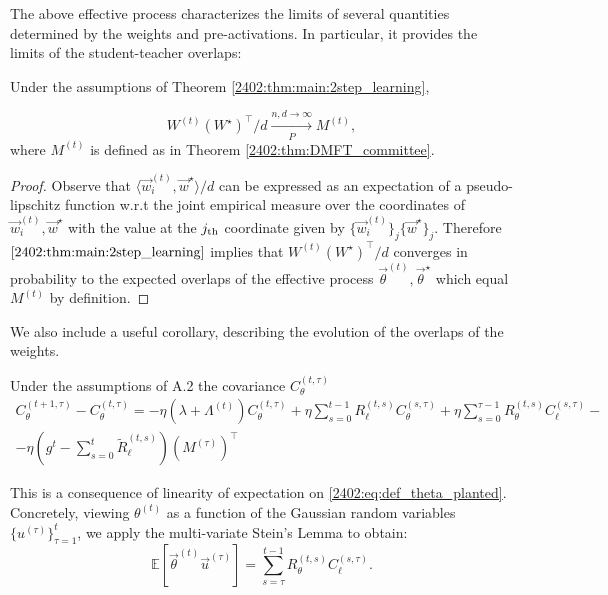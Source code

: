 The above effective process characterizes the limits of several quantities determined by the weights and pre-activations. In particular, it provides the limits of the student-teacher overlaps:
\begin{corollary}\label{2402:cor:overlap}
Under the assumptions of Theorem \ref{2402:thm:main:2step_learning}, 

\begin{equation}
    W^{(t)} (W^\star)^\top / d \xrightarrow[P]{n,d \rightarrow \infty} M^{(t)},
\end{equation}
where $M^{(t)}$ is defined as in Theorem \ref{2402:thm:DMFT_committee}.
\end{corollary}
\begin{proof}
    Observe that $\langle \vec{w}^{(t)}_i, \vec{w}^\star \rangle / d$ can be expressed as an expectation of a pseudo-lipschitz function w.r.t the joint empirical measure over the coordinates of $\vec{w}^{(t)}_i,\vec{w}^\star$ with the value at the $j_{\rm th}$ coordinate given by $\{\vec{w}^{(t)}_i\}_j\{\vec{w}^\star\}_j$. Therefore $\ref{2402:thm:main:2step_learning}$ implies that $W^{(t)} (W^\star)^\top / d$ converges in probability to the expected overlaps of the effective process $\vec \theta^{(t)},\vec{\theta}^\star$ which equal $M^{(t)}$ by definition.
\end{proof}
We also include a useful corollary, describing the evolution of the overlaps of the weights.

\begin{lemma}\label{2402:lem:cov}
Under the assumptions of A.2 the covariance $C_\theta^{(t,\tau)}$
\begin{align}
    C_\theta^{(t+1,\tau)} - C_\theta^{(t,\tau)} = - \eta \left(\lambda + \Lambda^{(t)}\right)C_\theta^{(t,\tau)} + \eta \sum_{s=0}^{t-1}R_\ell^{(t,s)}C_\theta^{(s,\tau)} + \eta \sum_{s=0}^{\tau-1} R_\theta^{(t,s)}C_\ell^{(s,\tau)} - \\
    - \eta \left( g^{t} - \sum_{s=0}^{t}\tilde R_\ell^{(t,s)}\right) \left(M^{(\tau)}\right)^\top
\end{align}
\end{lemma}
This is a consequence of linearity of expectation on \eqref{2402:eq:def_theta_planted}. Concretely, viewing $\theta^{(t)}$ as a function of the Gaussian random variables $\{u^{(\tau)}\}_{\tau=1}^t$, we apply the multi-variate Stein's Lemma to obtain:
\begin{equation}
    \mathbb{E}\left[ \vec\theta^{(t)} \vec u^{(\tau)}\right] = \sum_{s=\tau}^{t-1} R_\theta^{(t,s)}C_\ell^{(s,\tau)} .
\end{equation}



